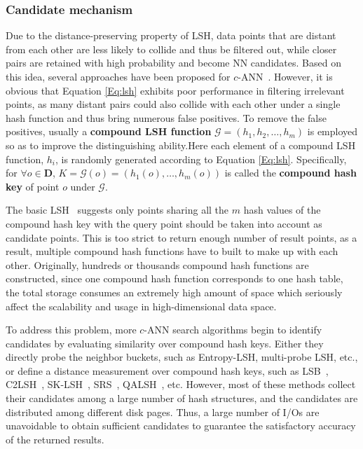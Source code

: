 \documentclass[twocolumn]{svjour3}          %
\begin{document}
\subsubsection{Candidate mechanism}
Due to the distance-preserving property of LSH, data points that are distant from each other are less likely to collide and thus be filtered out, while closer pairs are retained with high probability and become NN candidates. Based on this idea, several approaches have been proposed for $c$-ANN~\cite{Gionis1999,Datar2004,Lv2007,Tao2009LSB,Gan2012C2LSH}. However, it is obvious that Equation \ref{Eq:lsh} exhibits poor performance in filtering irrelevant points, as many distant pairs could also collide with each other under a single hash function and thus bring numerous false positives. To remove the false positives, usually a \textbf{compound LSH function} $\mathcal{G}=(h_1,h_2, \ldots, h_m)$ is employed so as to improve the distinguishing ability.Here each element of a compound LSH function, $h_i$, is randomly generated according to Equation \ref{Eq:lsh}. Specifically, for $\forall o\in \textbf{D}$, $K=\mathcal{G}(o)=(h_1(o), \ldots, h_m(o))$ is called the \textbf{compound hash key} of point $o$ under $\mathcal{G}$.

The basic LSH~\cite{Datar2004} suggests only points sharing all the $m$ hash values of the compound hash key with the query point should be taken into account as candidate points. This is too strict to return enough number of result points, as a result, multiple compound hash functions have to built to make up with each other. Originally, hundreds or thousands compound hash functions are constructed, since one compound hash function corresponds to one hash table, the total storage consumes an extremely high amount of space which seriously affect the scalability and usage in high-dimensional data space.

To address this problem, more $c$-ANN search algorithms begin to identify candidates by evaluating similarity over compound hash keys. Either they directly probe the neighbor buckets, such as Entropy-LSH, multi-probe LSH, etc., or define a distance measurement over compound hash keys, such as LSB~\cite{Tao2009LSB}, C2LSH~\cite{Gan2012C2LSH}, SK-LSH~\cite{Liu2014SKLSH}, SRS~\cite{Sun2014SRS}, QALSH~\cite{Huang2015QALSH}, etc. However, most of these methods collect their candidates among a large number of hash structures, and the candidates are distributed among different disk pages. Thus, a large number of I/Os are unavoidable to obtain sufficient candidates to guarantee the satisfactory accuracy of the returned results.
\end{document}

